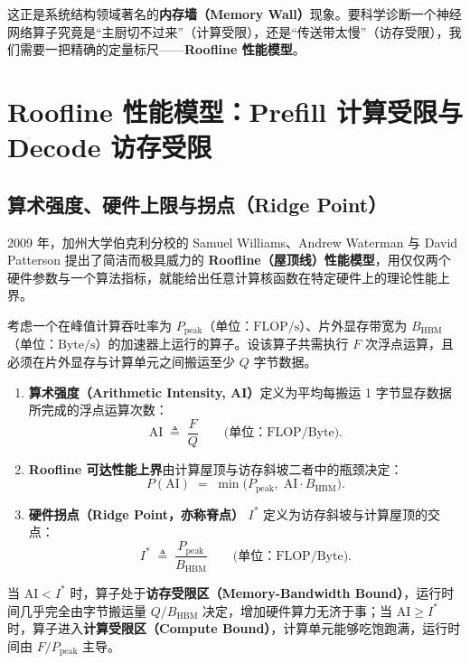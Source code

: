 这正是系统结构领域著名的\textbf{内存墙（Memory Wall）}现象。要科学诊断一个神经网络算子究竟是“主厨切不过来”（计算受限），还是“传送带太慢”（访存受限），我们需要一把精确的定量标尺——\textbf{Roofline 性能模型}。

\section{Roofline 性能模型：Prefill 计算受限与 Decode 访存受限}
\label{sec:roofline-model}

\subsection{算术强度、硬件上限与拐点（Ridge Point）}

2009 年，加州大学伯克利分校的 Samuel Williams、Andrew Waterman 与 David Patterson 提出了简洁而极具威力的 \textbf{Roofline（屋顶线）性能模型}，用仅仅两个硬件参数与一个算法指标，就能给出任意计算核函数在特定硬件上的理论性能上界。

\begin{defBox}
\begin{definition}
\label{def:roofline-ai}
考虑一个在峰值计算吞吐率为 $P_{\mathrm{peak}}$（单位：$\mathrm{FLOP/s}$）、片外显存带宽为 $B_{\mathrm{HBM}}$（单位：$\mathrm{Byte/s}$）的加速器上运行的算子。设该算子共需执行 $F$ 次浮点运算，且必须在片外显存与计算单元之间搬运至少 $Q$ 字节数据。
\begin{enumerate}
  \item \textbf{算术强度（Arithmetic Intensity, AI）}定义为平均每搬运 1 字节显存数据所完成的浮点运算次数：
  \begin{equation}
    \mathrm{AI} \;\triangleq\; \frac{F}{Q} \qquad \big(\text{单位：}\mathrm{FLOP/Byte}\big).
    \label{eq:ai-def}
  \end{equation}
  \item \textbf{Roofline 可达性能上界}由计算屋顶与访存斜坡二者中的瓶颈决定：
  \begin{equation}
    P(\mathrm{AI}) \;=\; \min\!\Big(P_{\mathrm{peak}},\; \mathrm{AI} \cdot B_{\mathrm{HBM}}\Big).
    \label{eq:roofline-perf}
  \end{equation}
  \item \textbf{硬件拐点（Ridge Point，亦称脊点）} $I^*$ 定义为访存斜坡与计算屋顶的交点：
  \begin{equation}
    I^* \;\triangleq\; \frac{P_{\mathrm{peak}}}{B_{\mathrm{HBM}}} \qquad \big(\text{单位：}\mathrm{FLOP/Byte}\big).
    \label{eq:ridge-point}
  \end{equation}
\end{enumerate}
当 $\mathrm{AI} < I^*$ 时，算子处于\textbf{访存受限区（Memory-Bandwidth Bound）}，运行时间几乎完全由字节搬运量 $Q / B_{\mathrm{HBM}}$ 决定，增加硬件算力无济于事；当 $\mathrm{AI} \ge I^*$ 时，算子进入\textbf{计算受限区（Compute Bound）}，计算单元能够吃饱跑满，运行时间由 $F / P_{\mathrm{peak}}$ 主导。
\end{definition}
\end{defBox}

